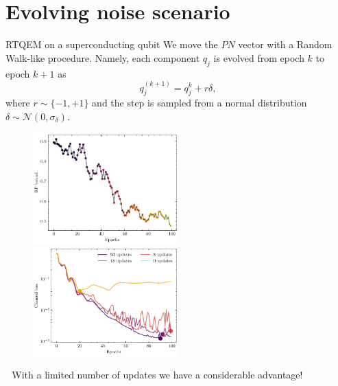 \documentclass[8pt, xcolor={svgnames}, hyperref={linkcolor=black}]{beamer}
\begin{document}
\section{Evolving noise scenario}

\begin{frame}{RTQEM on a superconducting qubit}
We move the $PN$ vector with a Random Walk-like procedure. Namely, each component 
$q_j$ is evolved from epoch $k$ to epoch $k+1$ as
$$q_j^{(k+1)} = q_j^{k} + r\delta,$$
where $r\sim\{-1,+1\}$ and the step is sampled from a normal distribution 
$\delta\sim\mathcal{N}(0,\sigma_{\delta})$.
\pause
\begin{figure}
    \includegraphics[width=0.5\textwidth]{figures/bound_variation.pdf}%
    \pause
    \includegraphics[width=0.5\textwidth]{figures/cleaned_losses.pdf}
\end{figure}
\pause
\centering
\faEnvelope\,\, With a limited number of updates we have a considerable advantage!
\end{frame}
\end{document}
